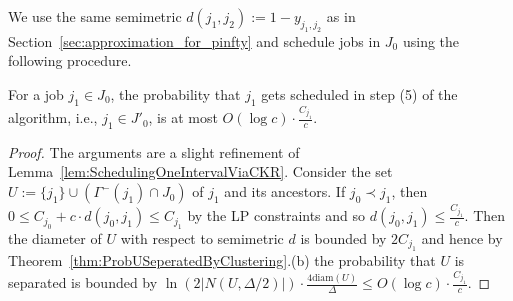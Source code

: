 We use the same semimetric $d(j_1,j_2) := 1-y_{j_1,j_2}$ as in Section~\ref{sec:approximation_for_pinfty} and schedule jobs in $J_0$ using the following procedure.

\begin{center}
\end{center}


\begin{lemma}\label{l:ctsecondbatch1}
  For a job $j_1 \in J_0$, the probability that $j_1$ gets scheduled in step (5) of the algorithm, 
i.e., $j_1 \in J'_0$, is at most  $O(\log c) \cdot \frac{C_{j_1}}{c}$.
\end{lemma}
\begin{proof}
  The arguments are a slight refinement of Lemma~\ref{lem:SchedulingOneIntervalViaCKR}.
  Consider the set $U := \{ j_1 \} \cup (\Gamma^{-}(j_1) \cap J_0)$ of $j_1$ and its ancestors. If $j_0 \prec j_1$, then $0 \leq C_{j_0} + c \cdot d(j_0,j_1) \leq C_{j_1}$ by the LP constraints and so $d(j_0,j_1) \leq \frac{C_{j_1}}{c}$.
  Then the diameter of $U$ with respect to semimetric $d$ is bounded by $2C_{j_1}$ and hence by Theorem~\ref{thm:ProbUSeperatedByClustering}.(b) the probability that $U$ is separated is bounded by $\ln(2|N(U,\Delta/2)|) \cdot \frac{4 \textrm{diam}(U)}{\Delta} \leq O(\log c) \cdot \frac{C_{j_1}}{c}$.
\end{proof}




